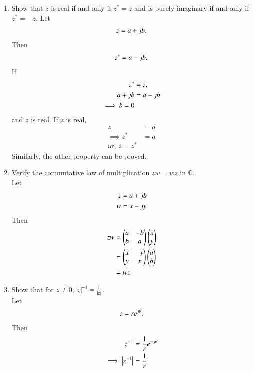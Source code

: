 \begin{enumerate}[label=\arabic*.,ref=\thesubsection.\theenumi]
\begin{enumerate}
				\end{enumerate}
			\item Show that $z$ is real if and only if $z^{*} = z$ and is purely imaginary if and only if $z^{*} = -z$.
				\solution Let
				\begin{align}
					z = a + \jmath b.
				\end{align}
				Then 
				\begin{align}
					z^{*} = a - \jmath b.
				\end{align}
				If 
				\begin{align}
					z^{*} &= z,
					\\
					a + \jmath b &= 
					a - \jmath b 
					\\
					\implies b = 0
				\end{align}
				and $z$ is real.  If $z$ is real, 
				\begin{align}
					z &= a
					\\
					\implies z^{*} &= a
					\\
					\text{or, } z = z^{*}
				\end{align}
Similarly, the other property can be proved.
\item Verify the commutative law of multiplication $zw  = wz$ in $\mathbb{C}$.
	\\
	\solution
	Let 
				\begin{align}
					z &= a + \jmath b
					\\
					w &= x - \jmath y
				\end{align}
				Then
				\begin{align}
					zw &= \begin{pmatrix}
						a & -b
						\\
						b & a
					\end{pmatrix}
					\begin{pmatrix}x \\ y\end{pmatrix}
					\\
					&=  \begin{pmatrix}
						x & -y
						\\
						y & x
					\end{pmatrix}
					\begin{pmatrix}a \\ b\end{pmatrix}
					\\
					&= wz
				\end{align}
			\item Show that for $z \ne 0$, $\left\vert z\right\vert^{-1} = \frac{1}{\left\vert z\right\vert}$.
				\\
				\solution 
				Let
				\begin{align}
					z = re^{\jmath \theta}.
				\end{align}
				Then 
				\begin{align}
					z^{-1} &= \frac{1}{r}e^{-\j \theta}
					\\
					\implies \abs{z^{-1}} &= \frac{1}{r}

\end{align}
\end{enumerate}
